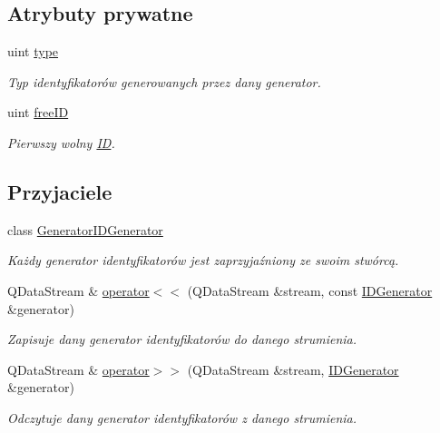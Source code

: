 \subsection*{Atrybuty prywatne}
\begin{DoxyCompactItemize}
\item 
uint \hyperlink{classIDGenerator_abe469295c859bc2edc533a190ae2e1d9}{type}
\begin{DoxyCompactList}\small\item\em Typ identyfikatorów generowanych przez dany generator. \item\end{DoxyCompactList}\item 
uint \hyperlink{classIDGenerator_a5685b28917288954557a222cab550298}{freeID}
\begin{DoxyCompactList}\small\item\em Pierwszy wolny \hyperlink{classIDGenerator_1_1ID}{ID}. \item\end{DoxyCompactList}\end{DoxyCompactItemize}
\subsection*{Przyjaciele}
\begin{DoxyCompactItemize}
\item 
class \hyperlink{classIDGenerator_ab840f4c248c2a91409f520e48e774cfb}{GeneratorIDGenerator}
\begin{DoxyCompactList}\small\item\em Każdy generator identyfikatorów jest zaprzyjaźniony ze swoim stwórcą. \item\end{DoxyCompactList}\item 
QDataStream \& \hyperlink{classIDGenerator_a244688be6d84ec73612ddd66ab376bd1}{operator$<$$<$} (QDataStream \&stream, const \hyperlink{classIDGenerator}{IDGenerator} \&generator)
\begin{DoxyCompactList}\small\item\em Zapisuje dany generator identyfikatorów do danego strumienia. \item\end{DoxyCompactList}\item 
QDataStream \& \hyperlink{classIDGenerator_a4f86069b5b5ede60ff2e613fbcf10de4}{operator$>$$>$} (QDataStream \&stream, \hyperlink{classIDGenerator}{IDGenerator} \&generator)
\begin{DoxyCompactList}\small\item\em Odczytuje dany generator identyfikatorów z danego strumienia. \item\end{DoxyCompactList}\end{DoxyCompactItemize}


